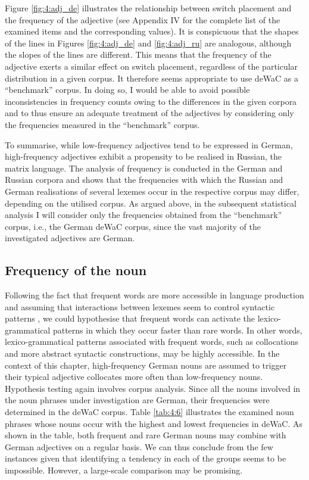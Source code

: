 Figure \ref{fig:4:adj_de} illustrates the relationship between switch placement and the frequency of the adjective (see Appendix IV for the complete list of the examined items and the corresponding values). It is conspicuous that the shapes of the lines in Figures \ref{fig:4:adj_de} and \ref{fig:4:adj_ru} are analogous, although the slopes of the lines are different. This means that the frequency of the adjective exerts a similar effect on switch placement, regardless of the particular distribution in a given corpus. It therefore seems appropriate to use deWaC as a “benchmark” corpus. In doing so, I would be able to avoid possible inconsistencies in frequency counts owing to the differences in the given corpora and to thus ensure an adequate treatment of the adjectives by considering only the frequencies measured in the “benchmark” corpus.

To summarise, while low-frequency adjectives tend to be expressed in German, high-frequency adjectives exhibit a propensity to be realised in Russian, the matrix language. The analysis of frequency is conducted in the German and Russian corpora and shows that the frequencies with which the Russian and German realisations of several lexemes occur in the respective corpus may differ, depending on the utilised corpus. As argued above, in the subsequent statistical analysis I will consider only the frequencies obtained from the “benchmark” corpus, i.e., the German deWaC corpus, since the vast majority of the investigated adjectives are German.

\subsection{Frequency of the noun}
\begin{sloppypar}
Following the fact that frequent words are more accessible in language production and assuming that interactions between lexemes seem to control syntactic patterns \citep[][115]{macwhinney1997}, we could hypothesise that frequent words can activate the lexico-grammatical patterns in which they occur faster than rare words. In other words, lexico-grammatical patterns associated with frequent words, such as collocations and more abstract syntactic constructions, may be highly accessible. In the context of this chapter, high-frequency German nouns are assumed to trigger their typical adjective collocates more often than low-frequency nouns. Hypothesis testing again involves corpus analysis. Since all the nouns involved in the noun phrases under investigation are German, their frequencies were determined in the deWaC corpus. Table \ref{tab:4:6} illustrates the examined noun phrases whose nouns occur with the highest and lowest frequencies in deWaC. As shown in the table, both frequent and rare German nouns may combine with German adjectives on a regular basis. We can thus conclude from the few instances given that identifying a tendency in each of the groups seems to be impossible. However, a large-scale comparison may be promising.
\end{sloppypar}

